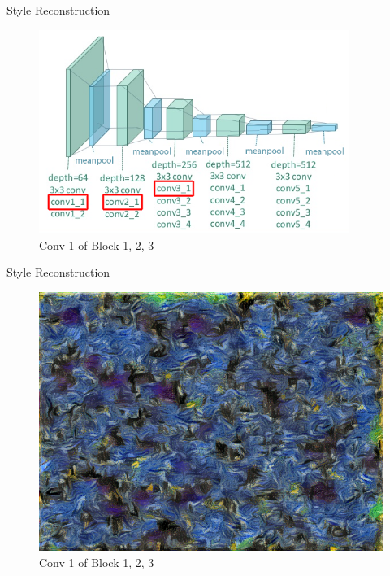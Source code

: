 \documentclass{beamer}
\begin{document}
\begin{frame}{Style Reconstruction}
\begin{figure}[ht]
\centering
\includegraphics[width=0.9\textwidth]{img/vgg19/style/block3_conv1}
\caption*{Conv 1 of Block 1, 2, 3}
\end{figure}
\end{frame}
\begin{frame}{Style Reconstruction}
\begin{figure}[ht]
\centering
\includegraphics[width=.8\textwidth]{img/style/block3_conv1}
\caption*{Conv 1 of Block 1, 2, 3}
\end{figure}
\end{frame}
\end{document}
